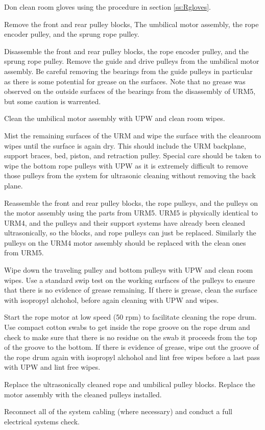 \documentclass[11pt]{article}
\begin{document}
\begin{answerlist}
\item Don clean room gloves using the procedure in section
  \ref{ss:Rgloves}.
\item Remove the front and rear pulley blocks, The umbilical motor
  assembly, the rope encoder pulley, and the sprung rope pulley.
\item Disassemble the front and rear pulley blocks, the rope encoder
  pulley, and the sprung rope pulley. Remove the guide and drive
  pulleys from the umbilical motor assembly. Be careful removing the
  bearings from the guide pulleys in particular as there is some
  potential for grease on the surfaces. Note that no grease was
  observed on the outside surfaces of the bearings from the
  disassembly of URM5, but some caution is warrented.
\item Clean the umbilical motor assembly with UPW and clean room
  wipes.
\item Mist the remaining surfaces of the URM and wipe the surface with
  the cleanroom wipes until the surface is again dry. This should
  include the URM backplane, support braces, bed, piston, and
  retraction pulley. Special care should be taken to wipe the bottom
  rope pulleys with UPW as it is extremely difficult to remove those
  pulleys from the system for ultrasonic cleaning without removing the
  back plane.
\item Reassemble the front and rear pulley blocks, the rope pulleys,
  and the pulleys on the motor assembly using the parts from
  URM5. URM5 is physically identical to URM4, and the pulleys and
  their support systems have already been cleaned ultrasonically, so
  the blocks, and rope pulleys can just be replaced. Similarly the
  pulleys on the URM4 motor assembly should be replaced with the clean
  ones from URM5.
\item Wipe down the traveling pulley and bottom pulleys with UPW and
  clean room wipes. Use a standard swip test on the working surfaces
  of the pulleys to ensure that there is no evidence of grease
  remaining. If there is grease, clean the surface with isopropyl
  alchohol, before again cleaning with UPW and wipes.
\item Start the rope motor at low speed (50 rpm) to facilitate
  cleaning the rope drum. Use compact cotton swabs to get inside the
  rope groove on the rope drum and check to make sure that there is no
  residue on the swab it proceeds from the top of the groove to the
  bottom. If there is evidence of grease, wipe out the groove of the
  rope drum again with isopropyl alchohol and lint free wipes before a
  last pass with UPW and lint free wipes.
\item Replace the ultrasonically cleaned rope and umbilical pulley
  blocks. Replace the motor assembly with the cleaned pulleys
  installed.
\item Reconnect all of the system cabling (where necessary) and
  conduct a full electrical systems check.
\end{answerlist}
\end{document}
